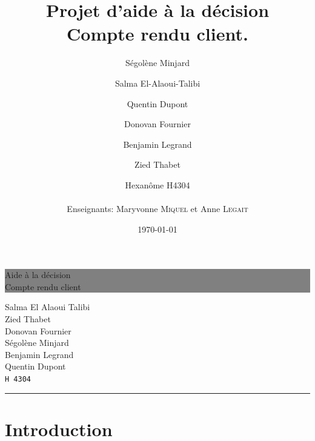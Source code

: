 \documentclass[12pt]{article}
\title{Projet d'aide à la décision \\ Compte rendu client.}
\date{\today}
\author{Ségolène Minjard \and Salma El-Alaoui-Talibi \and Quentin Dupont \and Donovan Fournier \and Benjamin Legrand \and Zied Thabet \and Hexanôme H4304 \\ \\ Enseignants: Maryvonne \textsc{Miquel}
et Anne \textsc{Legait}  }
\newcommand{\HRule}[1]{\hfill \rule{0.2\linewidth}{#1}} %
\begin{document}
\thispagestyle{empty} %

\colorbox{grey}{
	\parbox[t]{1.0\linewidth}{
		\centering \fontsize{40pt}{80pt}\selectfont %
		\vspace*{0.7cm} %
		
		\hfill Aide à la décision \\
		\hfill Compte rendu client\par
		
		\vspace*{0.7cm} %
	}
}


\vfill %


{\centering \large 
\hfill Salma El Alaoui Talibi \\
\hfill Zied Thabet \\
\hfill Donovan Fournier \\
\hfill Ségolène Minjard \\
\hfill Benjamin Legrand \\
\hfill Quentin Dupont \\
\hfill \texttt{H 4304} \\

\HRule{1.5pt}} %


\clearpage %

\vspace{25pt}
\setcounter{tocdepth}{2}
\tableofcontents %
\pagebreak
\section{Introduction}
\end{document}
